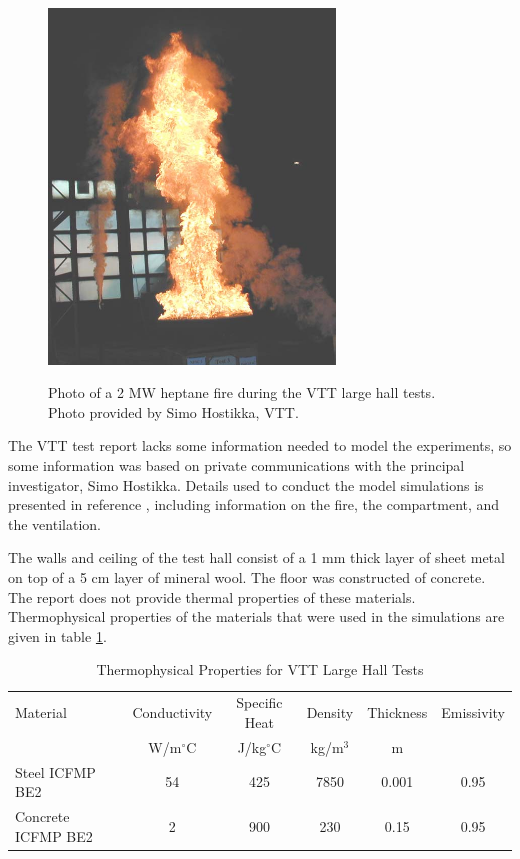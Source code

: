 \begin{figure}[\figoptions{b}]
\begin{center}
\includegraphics[width=3.0in]{FIGURES/VTT/VTT_2MW_fire}\\
\end{center}
\caption{Photo of a 2 MW heptane fire during the VTT large hall tests. Photo provided by Simo Hostikka, VTT.}
 \label{fig:VTT_2MW_fire}
\end{figure}

The VTT test report lacks some information needed to model the experiments, so some information was based on private communications with the principal investigator, Simo Hostikka. Details used to conduct the model simulations is presented in reference \cite{NRCNUREG1824Experimental}, including information on the fire, the compartment, and the ventilation.

The walls and ceiling of the test hall consist of a 1 mm thick layer of sheet metal on top of a 5 cm layer of mineral wool. The floor was constructed of concrete. The report does not provide thermal properties of these materials. Thermophysical properties of the materials that were used in the simulations are given in table \ref{tab:VTT_Thermals}.

\begin{table}[h!]
\begin{center}
\caption{Thermophysical Properties for VTT Large Hall Tests}
\label{tab:VTT_Thermals}
\vspace{0.1in}
\begin{tabular}{|l|c|c|c|c|c|}
\hline
Material & Conductivity & Specific Heat & Density & Thickness & Emissivity\\
 & W/m$^{\circ}$C & J/kg$^{\circ}$C & kg/m$^3$ & m & \\ \hline
\hline
Steel ICFMP BE2 & 54 &        425 &       7850 &      0.001 &       0.95  \\ \hline
Concrete ICFMP BE2 &          2 &        900 &        230 &       0.15 &       0.95 \\ \hline
\end{tabular}  
\end{center}
\end{table}

